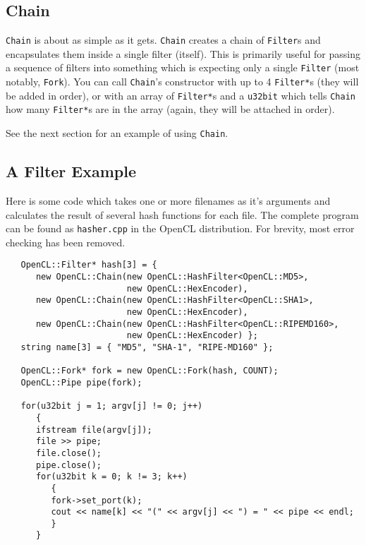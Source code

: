 \documentclass{article}
\newcommand{\filename}[1]{\texttt{#1}}
\newcommand{\type}[1]{\texttt{#1}}
\begin{document}
\subsection{Chain}

\type{Chain} is about as simple as it gets. \type{Chain} creates a chain of
\type{Filter}s and encapsulates them inside a single filter (itself). This is
primarily useful for passing a sequence of filters into something which is
expecting only a single \type{Filter} (most notably, \type{Fork}). You can call
\type{Chain}'s constructor with up to 4 \type{Filter*}s (they will be added in
order), or with an array of \type{Filter*}s and a \type{u32bit} which tells
\type{Chain} how many \type{Filter*}s are in the array (again, they will be
attached in order).

See the next section for an example of using \type{Chain}.

\pagebreak

\subsection{A Filter Example}

Here is some code which takes one or more filenames as it's arguments and
calculates the result of several hash functions for each file. The complete
program can be found as \filename{hasher.cpp} in the OpenCL distribution. For
brevity, most error checking has been removed.

\begin{verbatim}
   OpenCL::Filter* hash[3] = {
      new OpenCL::Chain(new OpenCL::HashFilter<OpenCL::MD5>,
                        new OpenCL::HexEncoder),
      new OpenCL::Chain(new OpenCL::HashFilter<OpenCL::SHA1>,
                        new OpenCL::HexEncoder),
      new OpenCL::Chain(new OpenCL::HashFilter<OpenCL::RIPEMD160>,
                        new OpenCL::HexEncoder) };
   string name[3] = { "MD5", "SHA-1", "RIPE-MD160" };

   OpenCL::Fork* fork = new OpenCL::Fork(hash, COUNT);
   OpenCL::Pipe pipe(fork);

   for(u32bit j = 1; argv[j] != 0; j++)
      {
      ifstream file(argv[j]);
      file >> pipe;
      file.close();
      pipe.close();
      for(u32bit k = 0; k != 3; k++)
         {
         fork->set_port(k);
         cout << name[k] << "(" << argv[j] << ") = " << pipe << endl;
         }
      }
\end{verbatim}

\pagebreak
\end{document}
